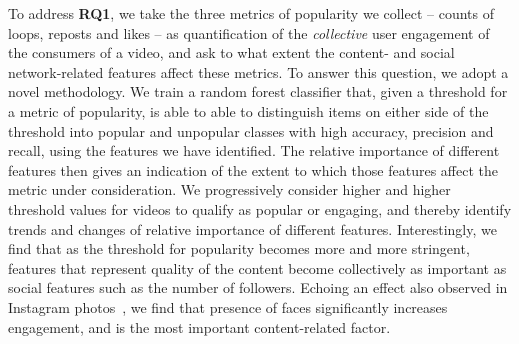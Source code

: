


%


To address \textbf{RQ1}, we take the three metrics of popularity we collect -- counts of loops, reposts and likes -- as quantification of the \emph{collective} user engagement of the consumers of a video, and ask to what extent the content- and social network-related features affect these metrics. To answer this question, we adopt a novel methodology.
We train a random forest classifier that, given a threshold for a metric of popularity, is able to able to distinguish items on either side of the threshold into popular and unpopular classes  with high accuracy, precision and recall, using the features we have identified. The relative importance of different features then gives an indication of the extent to which those features affect the metric under consideration. We progressively consider higher and higher threshold values for videos to qualify as popular or engaging, and thereby identify trends and changes of relative importance of different features. Interestingly, we find that as the threshold for popularity becomes more and more stringent, features that represent quality of the content become collectively as important as social features such as the number of followers. Echoing an effect also observed in Instagram photos~\cite{bakhshi2014faces}, we find that presence of faces significantly increases engagement, and is the most important content-related factor.

